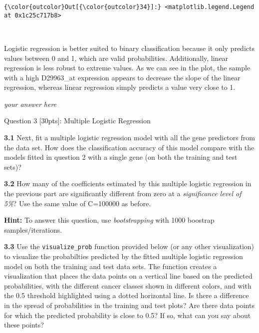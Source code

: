 \documentclass[11pt]{article}
\begin{document}
\begin{Verbatim}[commandchars=\\\{\}]
{\color{outcolor}Out[{\color{outcolor}34}]:} <matplotlib.legend.Legend at 0x1c25c717b8>
\end{Verbatim}
            
    \begin{center}
    \end{center}
    { \hspace*{\fill} \\}
    
    Logistic regression is better suited to binary classification because it
only predicts values between 0 and 1, which are valid probabilities.
Additionally, linear regression is less robust to extreme values. As we
can see in the plot, the sample with a high D29963\_at expression
appears to decrease the slope of the linear regression, whereas linear
regression simply predicts a value very close to 1.

    \emph{your answer here}

 Question 3 {[}30pts{]}: Multiple Logistic Regression

\textbf{3.1} Next, fit a multiple logistic regression model with all the
gene predictors from the data set. How does the classification accuracy
of this model compare with the models fitted in question 2 with a single
gene (on both the training and test sets)?

\textbf{3.2} How many of the coefficients estimated by this multiple
logistic regression in the previous part are significantly different
from zero at a \emph{significance level of 5\%}? Use the same value of
C=100000 as before.

\textbf{Hint:} To answer this question, use \emph{bootstrapping} with
1000 boostrap samples/iterations.

\textbf{3.3} Use the \texttt{visualize\_prob} function provided below
(or any other visualization) to visualize the probabilties predicted by
the fitted multiple logistic regression model on both the training and
test data sets. The function creates a visualization that places the
data points on a vertical line based on the predicted probabilities,
with the different cancer classes shown in different colors, and with
the 0.5 threshold highlighted using a dotted horizontal line. Is there a
difference in the spread of probabilities in the training and test
plots? Are there data points for which the predicted probability is
close to 0.5? If so, what can you say about these points?
\end{document}
